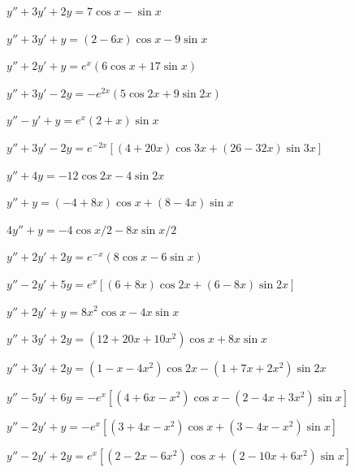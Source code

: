 \begin{exerciselist}

\item\label{exer:5.5.1}$y''+3y'+2y=7\cos x-\sin x$
\item\label{exer:5.5.2}$y''+3y'+y=(2-6x)\cos x-9\sin x$

\item\label{exer:5.5.3}$y''+2y'+y=e^x(6\cos x+17\sin x)$

\item\label{exer:5.5.4}$y''+3y'-2y=-e^{2x}(5\cos2x+9\sin2x)$

\item\label{exer:5.5.5}$y''-y'+y=e^x(2+x)\sin x$


\item\label{exer:5.5.6}$y''+3y'-2y=e^{-2x}\left[(4+20x)\cos 3x+(26-32x)\sin
3x\right]$

\item\label{exer:5.5.7}$y''+4y=-12\cos2x-4\sin2x$


\item\label{exer:5.5.8}$y''+y=(-4+8x)\cos x+(8-4x)\sin x$

\item\label{exer:5.5.9}$4y''+y=-4\cos x/2-8x\sin x/2$

\item\label{exer:5.5.10}$y''+2y'+2y=e^{-x}(8\cos x-6\sin x)$

\item\label{exer:5.5.11}$y''-2y'+5y=e^x\left[(6+8x)\cos
2x+(6-8x)\sin2x\right]$

\item\label{exer:5.5.12}$y''+2y'+y=8x^2\cos x-4x\sin x$

\item\label{exer:5.5.13}$y''+3y'+2y=(12+20x+10x^2)\cos x+8x\sin x$

\item\label{exer:5.5.14}$y''+3y'+2y=(1-x-4x^2)\cos2x-(1+7x+2x^2)\sin2x$


\item\label{exer:5.5.15}$y''-5y'+6y=-e^x\left[(4+6x-x^2)\cos x-(2-4x+3x^2)\sin x\right]$

\item\label{exer:5.5.16}$y''-2y'+y=-e^x\left[(3+4x-x^2)\cos x+(3-4x-x^2)\sin x\right]$

\item\label{exer:5.5.17}$y''-2y'+2y=e^x\left[(2-2x-6x^2)\cos x+(2-10x+6x^2)\sin x\right]$




\end{exerciselist}
